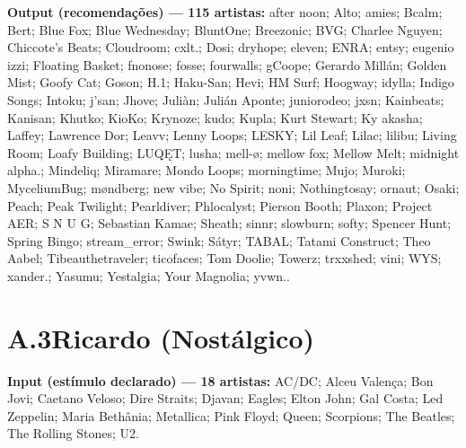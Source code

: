 \begin{apendicesenv}
\noindent\textbf{Output (recomendações) --- 115 artistas:} after noon; Alto; amies; Bcalm; Bert; Blue Fox; Blue Wednesday; BluntOne; Breezonic; BVG; Charlee Nguyen; Chiccote's Beats; Cloudroom; cxlt.; Dosi; dryhope; eleven; ENRA; entsy; eugenio izzi; Floating Basket; fnonose; fosse; fourwalls; gCoope; Gerardo Millán; Golden Mist; Goofy Cat; Goson; H.1; Haku-San; Hevi; HM Surf; Hoogway; idylla; Indigo Songs; Intoku; j'san; Jhove; Juliàn; Julián Aponte; juniorodeo; jxsn; Kainbeats; Kanisan; Khutko; KioKo; Krynoze; kudo; Kupla; Kurt Stewart; Ky akasha; Laffey; Lawrence Dor; Leavv; Lenny Loops; LESKY; Lil Leaf; Lilac; lilibu; Living Room; Loafy Building; LUQĘT; lusha; mell-ø; mellow fox; Mellow Melt; midnight alpha.; Mindeliq; Miramare; Mondo Loops; morningtime; Mujo; Muroki; MyceliumBug; møndberg; new vibe; No Spirit; noni; Nothingtosay; ornaut; Osaki; Peach; Peak Twilight; Pearldiver; Phlocalyst; Pierson Booth; Plaxon; Project AER; S N U G; Sebastian Kamae; Sheath; sinnr; slowburn; softy; Spencer Hunt; Spring Bingo; stream\_error; Swink; Sátyr; TABAL; Tatami Construct; Theo Aabel; Tibeauthetraveler; ticofaces; Tom Doolie; Towerz; trxxshed; vini; WYS; xander.; Yasumu; Yestalgia; Your Magnolia; yvwn..

\section*{A.3\quad Ricardo (Nostálgico)}

\noindent\textbf{Input (estímulo declarado) --- 18 artistas:} AC/DC; Alceu Valença; Bon Jovi; Caetano Veloso; Dire Straits; Djavan; Eagles; Elton John; Gal Costa; Led Zeppelin; Maria Bethânia; Metallica; Pink Floyd; Queen; Scorpions; The Beatles; The Rolling Stones; U2.



\end{apendicesenv}
